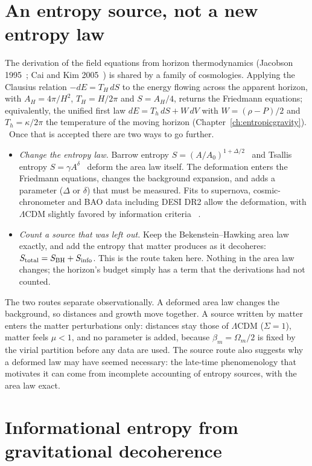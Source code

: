 \section{An entropy source, not a new entropy law}\label{sec:source}
The derivation of the field equations from horizon thermodynamics (Jacobson 1995~\cite{Jacobson1995}; Cai and Kim 2005~\cite{CaiKim2005}) is shared by a family of cosmologies. Applying the
Clausius relation $-dE=T_H\,dS$ to the energy flowing across the apparent horizon, with $A_H=4\pi/H^2$, $T_H=H/2\pi$ and $S=A_H/4$, returns the
Friedmann equations; equivalently, the unified first law $dE=T_h\,dS+W\,dV$ with $W=(\rho-P)/2$ and $T_h=\kappa/2\pi$ the temperature of the moving
horizon (Chapter~\ref{ch:entropicgravity}). \derived\ Once that is accepted
there are two ways to go further.
\begin{itemize}
\item \emph{Change the entropy law.} Barrow entropy $S=(A/A_0)^{1+\Delta/2}$~\cite{Barrow2020} and Tsallis entropy $S=\gamma A^\delta$~\cite{TsallisCirto2013}
deform the area law itself. The deformation enters the Friedmann equations, changes the background expansion, and adds a parameter
($\Delta$ or $\delta$) that must be measured. Fits to supernova, cosmic-chronometer and BAO data including DESI DR2 allow the deformation, with $\Lambda$CDM
slightly favored by information criteria~\cite{Luciano2025} \observed.
\item \emph{Count a source that was left out.} Keep the Bekenstein--Hawking area law exactly, and add the entropy that matter produces as it
decoheres: $S_{\rm total}=S_{\rm BH}+S_{\rm info}$. This is the route taken here. Nothing in the area law changes; the horizon's budget simply has a term
that the derivations had not counted.
\end{itemize}
The two routes separate observationally. A deformed area law changes the background, so distances and growth move together. A source written by
matter enters the matter perturbations only: distances stay those of $\Lambda$CDM ($\Sigma=1$), matter feels $\mu<1$, and no parameter is added,
because $\beta_m=\Omega_m/2$ is fixed by the virial partition before any data are used. The source route also suggests why a deformed law may have
seemed necessary: the late-time phenomenology that motivates it can come from incomplete accounting of entropy sources, with the area law exact.
\interp

\section{Informational entropy from gravitational decoherence}\label{sec:th:info}
